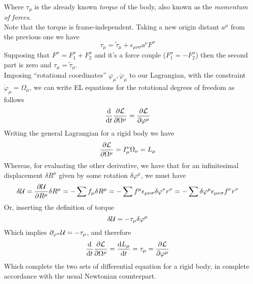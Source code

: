 \documentclass[../admech.tex]{subfiles}
\begin{document}
Where $\tau_\mu$ is the already known \emph{torque} of the body, also known as the \emph{momentum of forces}.\\
Note that the torque is frame-independent. Taking a new origin distant $a^\mu$ from the previous one we have
\begin{equation}
	\tau_\mu=\tilde{\tau}_\mu+\epsilon_{\mu\nu\sigma}a^\nu F^\sigma
	\label{eq:newtau}
\end{equation}
Supposing that $F^\sigma=F_1^\sigma+F_2^\sigma$ and it's a force couple ($F_1^\sigma=-F_2^\sigma$) then the second part is zero and $\tau_\mu=\tilde{\tau}_\mu$.\\
Imposing ``rotational coordinates'' $\varphi_\mu,\dot{\varphi}_\mu$ to our Lagrangian, with the constraint $\dot{\varphi}_\mu=\Omega_\mu$, we can write EL equations for the rotational degrees of freedom as follows
\begin{equation}
	\dv{t}\pdv{\mathcal{L}}{\Omega^\mu}=\pdv{\mathcal{L}}{\varphi^\mu}
	\label{eq:rotelrig}
\end{equation}
Writing the general Lagrangian for a rigid body we have
\begin{equation}
	\pdv{\mathcal{L}}{\Omega^\mu}=I^\nu_\mu\Omega_\nu=L_\mu
\end{equation}
Whereas, for evaluating the other derivative, we have that for an infinitesimal displacement $\delta R^\mu$ given by some rotation $\delta\varphi^\mu$, we must have
\begin{equation*}
	\delta\mathcal{U}=\pdv{\mathcal{U}}{R^\mu}\delta R^\mu=-\sum f_\mu\delta R^\mu=-\sum f^\mu\epsilon_{\mu\nu\sigma}\delta\varphi^\nu r^\sigma=-\sum\delta\varphi^\mu\epsilon_{\mu\nu\sigma}f^\nu r^\sigma
\end{equation*}
Or, inserting the definition of torque
\begin{equation*}
	\delta\mathcal{U}=-\tau_\mu\delta\varphi^\mu
\end{equation*}
Which implies $\partial_{\varphi^\mu}\mathcal{U}=-\tau_\mu$, and therefore
\begin{equation}
	\dv{t}\pdv{\mathcal{L}}{\Omega^\mu}=\dv{L_\mu}{t}=\tau_\mu=\pdv{\mathcal{L}}{\varphi^\mu}
	\label{eq:rotelrig1}
\end{equation}
Which complete the two sets of differential equation for a rigid body, in complete accordance with the usual Newtonian counterpart.
\end{document}
